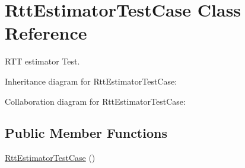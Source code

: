 \hypertarget{classRttEstimatorTestCase}{}\section{Rtt\+Estimator\+Test\+Case Class Reference}
\label{classRttEstimatorTestCase}


R\+TT estimator Test.  




Inheritance diagram for Rtt\+Estimator\+Test\+Case\+:


Collaboration diagram for Rtt\+Estimator\+Test\+Case\+:
\subsection*{Public Member Functions}
\begin{DoxyCompactItemize}
\item 
\hyperlink{classRttEstimatorTestCase_a8135cfdd2f3dbb55c805fb8d691b080b}{Rtt\+Estimator\+Test\+Case} ()
\end{DoxyCompactItemize}
